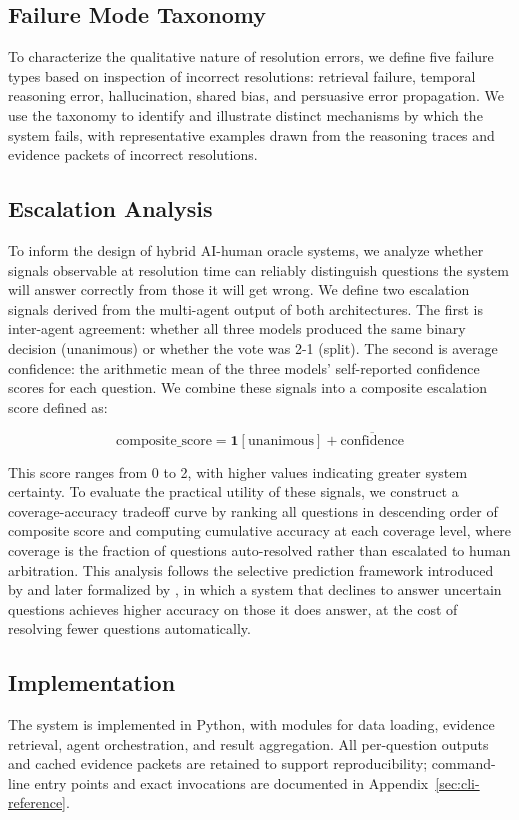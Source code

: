 \subsection{Failure Mode Taxonomy}

To characterize the qualitative nature of resolution errors, we define five failure types based on inspection of incorrect resolutions: retrieval failure, temporal reasoning error, hallucination, shared bias, and persuasive error propagation. We use the taxonomy to identify and illustrate distinct mechanisms by which the system fails, with representative examples drawn from the reasoning traces and evidence packets of incorrect resolutions.

\subsection{Escalation Analysis}

To inform the design of hybrid AI-human oracle systems, we analyze whether signals observable at resolution time can reliably distinguish questions the system will answer correctly from those it will get wrong. We define two escalation signals derived from the multi-agent output of both architectures. The first is inter-agent agreement: whether all three models produced the same binary decision (unanimous) or whether the vote was 2-1 (split). The second is average confidence: the arithmetic mean of the three models' self-reported confidence scores for each question. We combine these signals into a composite escalation score defined as:

\[
\text{composite\_score} = \mathbf{1}[\text{unanimous}] + \overline{\text{confidence}}
\]

This score ranges from 0 to 2, with higher values indicating greater system certainty. To evaluate the practical utility of these signals, we construct a coverage-accuracy tradeoff curve by ranking all questions in descending order of composite score and computing cumulative accuracy at each coverage level, where coverage is the fraction of questions auto-resolved rather than escalated to human arbitration. This analysis follows the selective prediction framework introduced by \cite{chow1970optimum} and later formalized by \cite{geifman2017selective}, in which a system that declines to answer uncertain questions achieves higher accuracy on those it does answer, at the cost of resolving fewer questions automatically.

\subsection{Implementation}

The system is implemented in Python, with modules for data loading, 
evidence retrieval, agent orchestration, and result aggregation. All 
per-question outputs and cached evidence packets are retained to 
support reproducibility; command-line entry points and exact 
invocations are documented in Appendix~\ref{sec:cli-reference}.